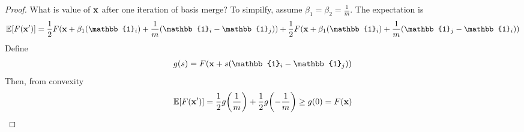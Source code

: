 \begin{theorem}
	\begin{proof}
		What is value of $\vb{x}$ after one iteration of basis merge? To simpilfy, assume $\beta_1=\beta_2=\frac{1}{m}$. The expectation is
		\begin{align}
			\mathbb{E} [F(\vb{x}')] = \frac{1}{2} F(\vb{x} + \beta_1\qty(\mathbb{1}_i)+ \frac{1}{m}\qty(\mathbb{1}_i-\mathbb{1}_j))+\frac{1}{2} F(\vb{x} + \beta_1\qty(\mathbb{1}_i)+ \frac{1}{m}\qty(\mathbb{1}_j-\mathbb{1}_i))
		\end{align}
		Define
		\begin{align}
		g(s) = F\qty(\vb{x}+s\qty(\mathbb{1}_i-\mathbb{1}_j))
		\end{align}
		Then, from convexity
		\begin{align}
		\mathbb{E} [F(\vb{x}')] = \frac{1}{2}g\qty(\frac{1}{m})+\frac{1}{2}g\qty(-\frac{1}{m}) \geq g(0) = F(\vb{x})
		\end{align}
	\end{proof}
\end{theorem}


